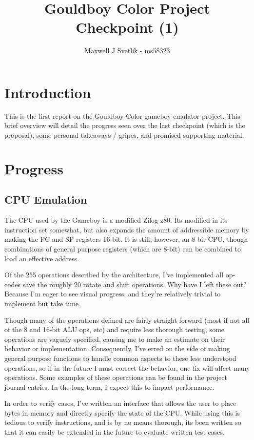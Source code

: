 \documentclass{article}
\title{Gouldboy Color Project Checkpoint (1)}
\author{Maxwell J Svetlik - ms58323}
\begin{document}
    \maketitle

\section{Introduction}
    This is the first report on the Gouldboy Color gameboy emulator project. 
    This brief overview will detail the progress seen over the last checkpoint (which is the proposal), 
    some personal takeaways / gripes, and promised supporting material.
\section{Progress}
    \subsection{CPU Emulation}
    The CPU used by the Gameboy is a modified Zilog z80. Its modified in its instruction set somewhat, but 
    also expands the amount of addressible memory by making the PC and SP registers 16-bit. 
    It is still, however, an 8-bit CPU, though combinations of general purpose registers (which are 8-bit) can be combined 
    to load an effective address.
    \par
    Of the 255 operations described by the architecture, 
    I've implemented all op-codes save the roughly 20 rotate and shift operations. Why have I left these out? 
    Because I'm eager to see visual progress, and they're relatively trivial to implement but take time.
    \par
    Though many of the operations defined are fairly straight forward (most if not all of the 8 and 16-bit ALU ops, etc) 
    and require less thorough testing, some operations are vaguely specified, causing me to make an estimate on their behavior or implementation. 
    Consequently, I've erred on the side of making general purpose functions to handle common aspects to these less understood operations, 
    so if in the future I must correct the behavior, one fix will affect many operations. 
    Some examples of these operations can be found in the project journal entries.
    In the long term, I expect this to impact performance. 
    \par 
    In order to verify cases, I've written an interface that allows the user to place bytes in memory and directly specify the state of the CPU. 
    While using this is tedious to verify instructions, and is by no means thorough, its been written so that 
    it can easily be extended in the future to evaluate written test cases.
\end{document}
